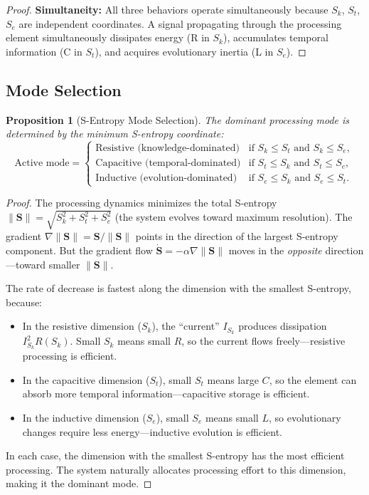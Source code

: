 \documentclass[twocolumn,10pt]{article}
\newtheorem{proposition}[theorem]{Proposition}
\theoremstyle{remark}
\newcommand{\Sk}{S_k}
\newcommand{\St}{S_t}
\newcommand{\Se}{S_e}
\newcommand{\Scoord}{\mathbf{S}}
\begin{document}
\begin{proof}
\textbf{Simultaneity:} All three behaviors operate simultaneously because $\Sk$, $\St$, $\Se$ are independent coordinates. A signal propagating through the processing element simultaneously dissipates energy (R in $\Sk$), accumulates temporal information (C in $\St$), and acquires evolutionary inertia (L in $\Se$).
\end{proof}

\subsection{Mode Selection}

\begin{proposition}[S-Entropy Mode Selection]
\label{prop:mode_selection}
The dominant processing mode is determined by the minimum S-entropy coordinate:
\begin{equation}
\text{Active mode} = \begin{cases}
\text{Resistive (knowledge-dominated)} & \text{if } \Sk \leq \St \text{ and } \Sk \leq \Se, \\
\text{Capacitive (temporal-dominated)} & \text{if } \St \leq \Sk \text{ and } \St \leq \Se, \\
\text{Inductive (evolution-dominated)} & \text{if } \Se \leq \Sk \text{ and } \Se \leq \St.
\end{cases}
\label{eq:mode_selection}
\end{equation}
\end{proposition}

\begin{proof}
The processing dynamics minimizes the total S-entropy $\|\Scoord\| = \sqrt{\Sk^2 + \St^2 + \Se^2}$ (the system evolves toward maximum resolution). The gradient $\nabla\|\Scoord\| = \Scoord / \|\Scoord\|$ points in the direction of the largest S-entropy component. But the gradient flow $\dot{\Scoord} = -\alpha\nabla\|\Scoord\|$ moves in the \emph{opposite} direction---toward smaller $\|\Scoord\|$.

The rate of decrease is fastest along the dimension with the smallest S-entropy, because:
\begin{itemize}
\item In the resistive dimension ($\Sk$), the ``current'' $I_{\Sk}$ produces dissipation $I_{\Sk}^2 R(\Sk)$. Small $\Sk$ means small $R$, so the current flows freely---resistive processing is efficient.
\item In the capacitive dimension ($\St$), small $\St$ means large $C$, so the element can absorb more temporal information---capacitive storage is efficient.
\item In the inductive dimension ($\Se$), small $\Se$ means small $L$, so evolutionary changes require less energy---inductive evolution is efficient.
\end{itemize}

In each case, the dimension with the smallest S-entropy has the most efficient processing. The system naturally allocates processing effort to this dimension, making it the dominant mode.
\end{proof}
\end{document}
